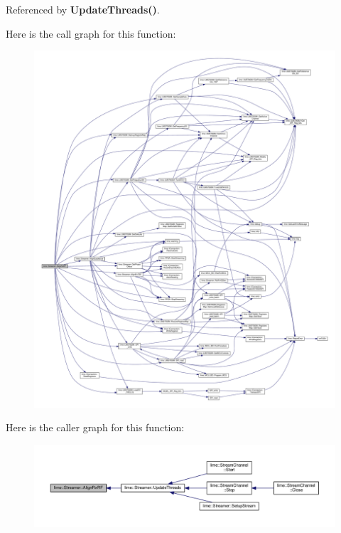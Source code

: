 Referenced by {\bf Update\+Threads()}.



Here is the call graph for this function\+:
\nopagebreak
\begin{figure}[H]
\begin{center}
\leavevmode
\includegraphics[width=350pt]{d9/d5d/classlime_1_1Streamer_a05cbd39a0d43b90b7fc2543ec246e9bb_cgraph}
\end{center}
\end{figure}




Here is the caller graph for this function\+:
\nopagebreak
\begin{figure}[H]
\begin{center}
\leavevmode
\includegraphics[width=350pt]{d9/d5d/classlime_1_1Streamer_a05cbd39a0d43b90b7fc2543ec246e9bb_icgraph}
\end{center}
\end{figure}


